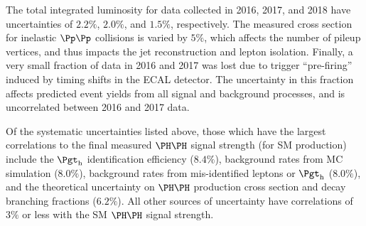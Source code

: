 The total integrated luminosity for data collected in 2016, 2017, and 2018
have uncertainties of $2.2\%$, $2.0\%$, and $1.5\%$, respectively. %
The measured cross section for inelastic $\Pp\Pp$ collisions is varied by
$5\%$, which affects the number of pileup vertices, and thus impacts the
jet reconstruction and lepton isolation. %
Finally, a very small fraction of data in 2016 and 2017 was lost due to
trigger ``pre-firing'' induced by timing shifts in the ECAL detector.
The uncertainty in this fraction affects predicted event yields from
all signal and background processes, and is uncorrelated between 2016
and 2017 data. %

Of the systematic uncertainties listed above, those which have the largest
correlations to the final measured $\HH$ signal strength (for SM production)
include the $\tauh$ identification efficiency ($8.4\%$), background rates
from MC simulation ($8.0\%$), background rates from mis-identified leptons
or $\tauh$ ($8.0\%$), and the theoretical uncertainty on $\HH$ production
cross section and decay branching fractions ($6.2\%$).
All other sources of uncertainty have correlations of $3\%$ or less with
the SM $\HH$ signal strength.

